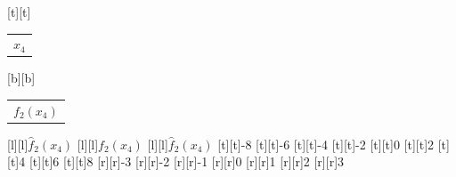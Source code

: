 %    
%
%
\begin{psfrags}%
\psfragscanon%
%
[t][t]{\setlength{\tabcolsep}{0pt}\begin{tabular}{c}$x_4$\end{tabular}}%
[b][b]{\setlength{\tabcolsep}{0pt}\begin{tabular}{c}$f_2(x_4)$\end{tabular}}%
[l][l]{$\hat f_2(x_4)$}%
[l][l]{$f_2(x_4)$}%
[l][l]{$\hat f_2(x_4)$}%
%
[t][t]{-8}%
[t][t]{-6}%
[t][t]{-4}%
[t][t]{-2}%
[t][t]{0}%
[t][t]{2}%
[t][t]{4}%
[t][t]{6}%
[t][t]{8}%
%
[r][r]{-3}%
[r][r]{-2}%
[r][r]{-1}%
[r][r]{0}%
[r][r]{1}%
[r][r]{2}%
[r][r]{3}%
%
%
\end{psfrags}%
%
